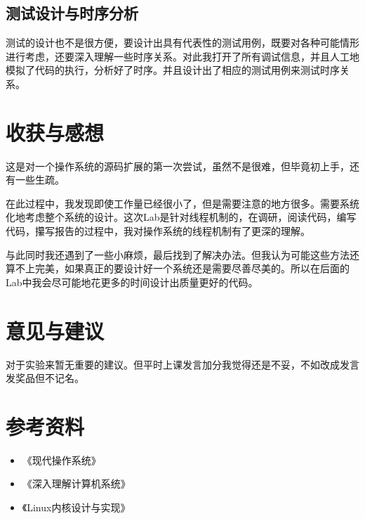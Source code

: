 \documentclass{ctexart}
\begin{document}
\subsection*{测试设计与时序分析}
测试的设计也不是很方便，要设计出具有代表性的测试用例，既要对各种可能情形进行考虑，还要深入理解一些时序关系。对此我打开了所有调试信息，并且人工地模拟了代码的执行，分析好了时序。并且设计出了相应的测试用例来测试时序关系。
\section{收获与感想}
这是对一个操作系统的源码扩展的第一次尝试，虽然不是很难，但毕竟初上手，还有一些生疏。

在此过程中，我发现即使工作量已经很小了，但是需要注意的地方很多。需要系统化地考虑整个系统的设计。这次Lab是针对线程机制的，在调研，阅读代码，编写代码，攥写报告的过程中，我对操作系统的线程机制有了更深的理解。

与此同时我还遇到了一些小麻烦，最后找到了解决办法。但我认为可能这些方法还算不上完美，如果真正的要设计好一个系统还是需要尽善尽美的。所以在后面的Lab中我会尽可能地花更多的时间设计出质量更好的代码。

\section{意见与建议}
对于实验来暂无重要的建议。但平时上课发言加分我觉得还是不妥，不如改成发言发奖品但不记名。

\section{参考资料}
\begin{itemize}
\item 《现代操作系统》
\item 《深入理解计算机系统》
\item 《Linux内核设计与实现》
\end{itemize}
\end{document}
